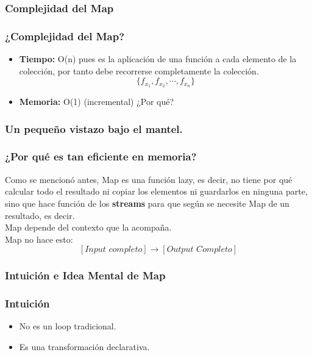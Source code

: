 \documentclass{beamer}
\begin{document}
\subsubsection{Complejidad del Map}
\begin{frame}[fragile]
    \frametitle{¿Complejidad del Map?}
    \begin{itemize}
        \item \textbf{Tiempo:} O(n) pues es la aplicación de una función a cada elemento
        de la colección, por tanto debe recorrerse completamente la colección.
        $$
        \{ f_{x_1} , f_{x_2}, \cdots, f_{x_n} \}
        $$
        \item \textbf{Memoria: } O(1) (incremental) ¿Por qué?
    \end{itemize}
\end{frame}

\subsubsection{Un pequeño vistazo bajo el mantel.}

\begin{frame}[fragile]
    \frametitle{¿Por qué es tan eficiente en memoria?}
    Como se mencionó antes, Map es una función lazy, es decir, no tiene por qué calcular
    todo el resultado ni copiar los elementos ni guardarlos en ninguna parte, sino que hace
    función de los \textbf{streams} para que según se necesite Map de un resultado, es decir.\\ 
    Map depende del contexto que la acompaña.\\ 
    Map no hace esto:
    $$
    [\textit{Input completo}] \rightarrow [\textit{Output Completo}]
    $$
\end{frame}

\subsubsection{Intuición e Idea Mental de Map}

\begin{frame}[fragile]
    \frametitle{Intuición}
    \begin{itemize}
        \item No es un loop tradicional.
        \item Es una transformación declarativa.
    \end{itemize}
\end{frame}
\end{document}
